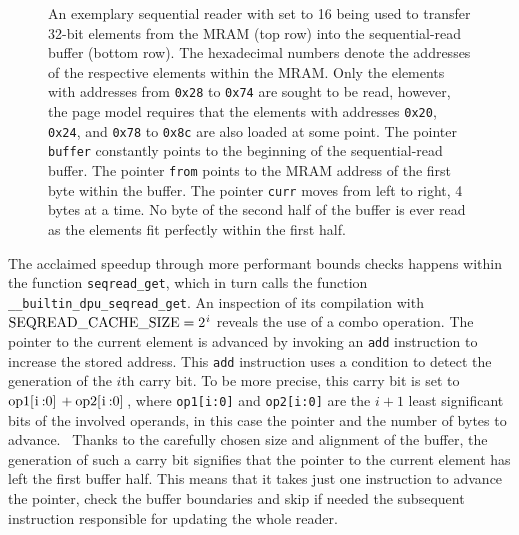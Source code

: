 \begin{figure}

	\caption{
		An exemplary sequential reader with \seqreadcachesize{} set to 16 being used to transfer 32-bit elements from the \ac{MRAM} (top row) into the sequential-read buffer (bottom row).
		The hexadecimal numbers denote the addresses of the respective elements within the \ac{MRAM}.
		Only the elements with addresses from \lstinline|0x28| to \lstinline|0x74| are sought to be read, however, the page model requires that the elements with addresses \lstinline|0x20|, \lstinline|0x24|, and \lstinline|0x78| to \lstinline|0x8c| are also loaded at some point.
		The pointer \lstinline|buffer| constantly points to the beginning of the sequential-read buffer.
		The pointer \lstinline|from| points to the \ac{MRAM} address of the first byte within the buffer.
		The pointer \lstinline|curr| moves from left to right, 4 bytes at a time.
		No byte of the second half of the buffer is ever read as the elements fit perfectly within the first half.
	}
	\label{fig:merge:reader}
\end{figure}

The acclaimed speedup through more performant bounds checks happens within the function \lstinline|seqread_get|, which in turn calls the function \lstinline|__builtin_dpu_seqread_get|.
An inspection of its compilation with \(\seqreadcachesize{} = \twotoi\) reveals the use of a combo operation.
The pointer to the current element is advanced by invoking an \lstinline|add| instruction to increase the stored address.
This \lstinline|add| instruction uses a condition to detect the generation of the \(i\)th carry bit.
To be more precise, this carry bit is set to \(\text{\lstinline|op1[i:0]|} + \text{\lstinline|op2[i:0]|}\), where \lstinline|op1[i:0]| and \lstinline|op2[i:0]| are the \(i + 1\) least significant bits of the involved operands, in this case the pointer and the number of bytes to advance.~\cite[DPU Handbook -- Specific Conditions Common To Addition and Subtraction]{upmemSDK}
Thanks to the carefully chosen size and alignment of the buffer, the generation of such a carry bit signifies that the pointer to the current element has left the first buffer half.
This means that it takes just one instruction to advance the pointer, check the buffer boundaries and skip \Dash if needed \Dash the subsequent instruction responsible for updating the whole reader.
